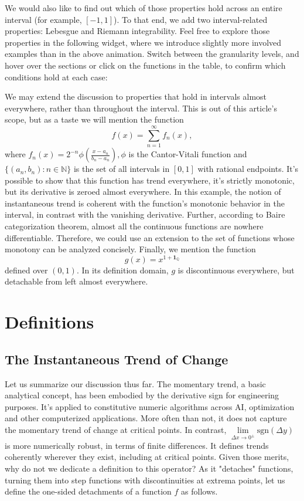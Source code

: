 \documentclass[11pt]{book}
\begin{document}
We would also like to find out which of those properties hold across an entire interval (for example, $[-1,1]$). To that end, we add two interval-related properties: Lebesgue and Riemann integrability. Feel free to explore those properties in the following widget, where we introduce slightly more involved examples than in the above animation. Switch between the granularity levels, and hover over the sections or click on the functions in the table, to confirm which conditions hold at each case:

We may extend the discussion to properties that hold in intervals almost everywhere, rather than throughout the interval. This is out of this article's scope, but as a taste we will mention the function $$f(x)=\sum\limits_{n=1}^{\infty}f_n(x),$$ where $f_n(x)=2^{-n}\phi\left(\frac{x-a_n}{b_n-a_n}\right)
, \phi$ is the Cantor-Vitali function and $\{(a_n,b_n):n\in\mathbb{N}\}$ is the set of all intervals in $\left[0,1\right]$ with rational endpoints. It's possible to show that this function has trend everywhere, it's strictly monotonic, but its derivative is zeroed almost everywhere. In this example, the notion of instantaneous trend is coherent with the function's monotonic behavior in the interval, in contrast with the vanishing derivative. Further, according to Baire categorization theorem, almost all the continuous functions are nowhere differentiable. Therefore, we could use an extension to the set of functions whose monotony can be analyzed concisely. Finally, we mention the function $$g\left(x\right)=x^{1+\boldsymbol{1}_{\mathbb{Q}}}$$ defined over $\left(0,1\right)$. In its definition domain, $g$ is discontinuous everywhere, but detachable from left almost everywhere.

\section{Definitions}
\subsection{The Instantaneous Trend of Change}

Let us summarize our discussion thus far. The momentary trend, a basic analytical concept, has been embodied by the derivative sign for engineering purposes. It's applied to constitutive numeric algorithms across AI, optimization and other computerized applications. More often than not, it does not capture the momentary trend of change at critical points. In contrast, $\underset{\Delta x\rightarrow0^{\pm}}{\lim}\text{sgn}\left(\Delta y\right)$ is more numerically robust, in terms of finite differences. It defines trends coherently wherever they exist, including at critical points. Given those merits, why do not we dedicate a definition to this operator? As it "detaches" functions, turning them into step functions with discontinuities at extrema points, let us define the one-sided detachments of a function $f$ as follows.
\end{document}

